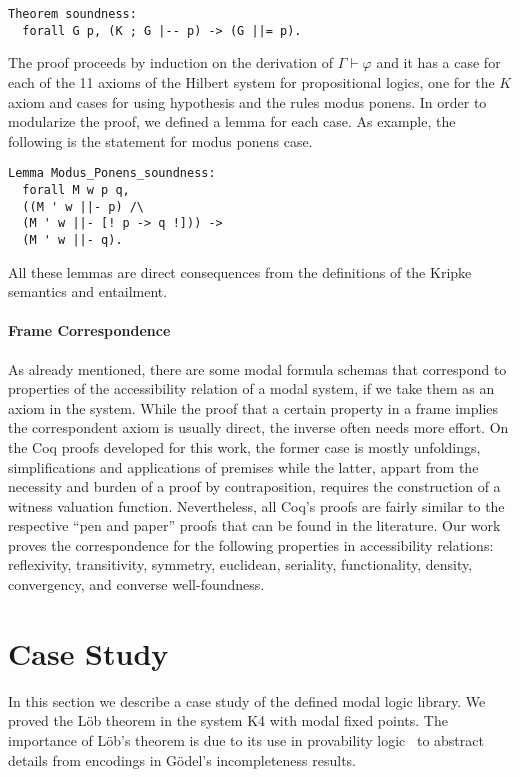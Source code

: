 \documentclass[sigconf,anonymous]{acmart}
\begin{document}
\begin{verbatim}
Theorem soundness:
  forall G p, (K ; G |-- p) -> (G ||= p).
\end{verbatim}

The proof proceeds by induction on the derivation of $\Gamma \vdash\varphi$ and
it has a case for each of the 11 axioms of the Hilbert system for propositional
logics, one for the $K$ axiom and cases for using hypothesis and the rules modus
ponens. In order to modularize the proof, we defined a lemma for each case.
As example, the following is the statement for modus ponens case.
\begin{verbatim}
Lemma Modus_Ponens_soundness:
  forall M w p q,
  ((M ' w ||- p) /\
  (M ' w ||- [! p -> q !])) ->
  (M ' w ||- q).
\end{verbatim}
All these lemmas are direct consequences from the definitions of the Kripke
semantics and entailment.

\paragraph{Frame Correspondence} 
As already mentioned, there are some modal formula schemas that correspond
to properties of the accessibility relation of a modal system, if we take them
as an axiom in the system.  While the proof that a certain property in a frame
implies the correspondent axiom is usually  direct, the inverse often needs
more effort. On the Coq proofs developed for this work,  the former case is
mostly unfoldings, simplifications and applications of premises
while the latter, appart from the necessity and burden of a proof by contraposition, 
requires the construction of a witness valuation function. 
Nevertheless, all Coq's proofs are fairly similar to the respective
``pen and paper'' proofs that  can be found in the literature. 
Our work proves the correspondence for the  following properties in
accessibility relations: reflexivity, transitivity, symmetry,  euclidean,
seriality, functionality, density, convergency, and converse well-foundness.

\section{Case Study}\label{sec:case}

In this section we describe a case study of the defined modal logic library.
We proved the L\"ob theorem in the system K4 with modal fixed points.
The importance of L\"ob's theorem is due to its use in provability
logic~\cite{boolos_1994} to abstract details from encodings in G\"odel's
incompleteness results.
\end{document}
